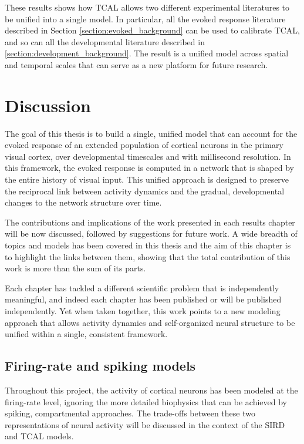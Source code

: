 \documentclass[phd,ianc,twoside]{infthesis}
\begin{document}
These results shows how TCAL allows two different experimental literatures to be
unified into a single model. In particular, all the evoked
response literature described in Section \ref{section:evoked_background}
can be used to calibrate TCAL, and so can all the developmental literature
described in \ref{section:development_background}. The result is a
unified model across spatial and temporal scales that can serve as a new
platform for future research.

\chapter{Discussion}
\label{chapter:Discussion}

The goal of this thesis is to build a single, unified model that
can account for the evoked response of an extended population of
cortical neurons in the primary visual cortex, over developmental
timescales and with millisecond resolution. In this framework, the
evoked response is computed in a network that is shaped by the entire
history of visual input. This unified approach is designed to preserve
the reciprocal link between activity dynamics and the gradual,
developmental changes to the network structure over time.

The contributions and implications of the work presented in each results
chapter will be now discussed, followed by suggestions for future work.
A wide breadth of topics and models has been covered in this thesis and
the aim of this chapter is to highlight the links between them, showing
that the total contribution of this work is more than the sum of its
parts.

Each chapter has tackled a different scientific problem that is independently
meaningful, and indeed each chapter has been published or will be published
independently.  Yet when taken together, this work points to a
new modeling approach that allows activity dynamics and self-organized
neural structure to be unified within a single, consistent framework.



\section{Firing-rate and spiking models} %

Throughout this project, the activity of cortical neurons has been
modeled at the firing-rate level, ignoring the more detailed biophysics
that can be achieved by spiking, compartmental approaches. The
trade-offs between these two representations of neural activity will be
discussed in the context of the SIRD and TCAL models.
\end{document}

